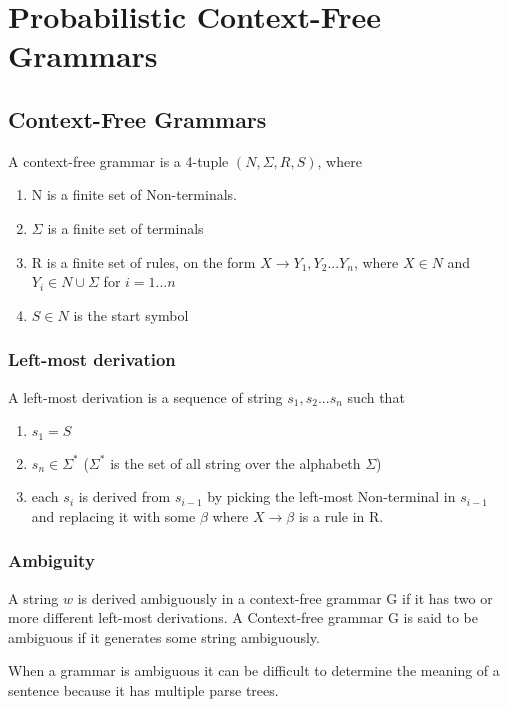 
\section{Probabilistic Context-Free Grammars}


\subsection{Context-Free Grammars}
A context-free grammar is a 4-tuple $(N, \Sigma, R, S)$, where
\begin{enumerate}
\item N is a finite set of Non-terminals.   
\item $\Sigma$ is a finite set of terminals 
\item R is a finite set of rules, on the form $X \rightarrow Y_1,Y_2 ... Y_n$,
where $X \in N$ and $Y_i \in N \cup \Sigma$ for $i = 1 ... n$
\item $S \in N$ is the start symbol
\end{enumerate}
\cite[p.104]{sipser}
\cite[p.1]{collins}

\subsubsection{Left-most derivation}
A left-most derivation is a sequence of string $s_1, s_2 ... s_n$ such that
\begin{enumerate}
\item $s_1 = S$
\item $s_n \in \Sigma^*$ ($\Sigma^*$ is the set of all string over the alphabeth $\Sigma$)
\item each $s_i$ is derived from $s_{i-1}$ by picking the left-most Non-terminal in $s_{i-1}$ and replacing it with some $\beta$ where $X \rightarrow \beta$  is a rule in R.
\end{enumerate} 
\cite[p.2]{collins}

\subsubsection{Ambiguity}
A string $w$ is derived ambiguously in a context-free grammar G if it has two or
more different left-most derivations.
A Context-free grammar G is said to be ambiguous if it generates some string ambiguously.
\cite[p.108]{sipser}

When a grammar is ambiguous it can be difficult to determine the meaning of a sentence because
it has multiple parse trees.

